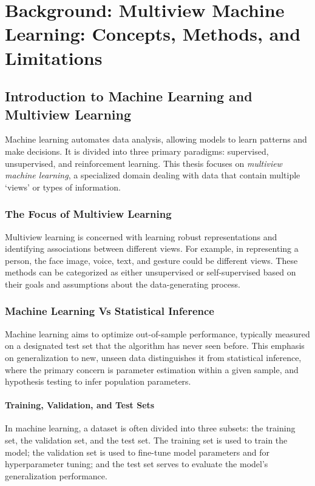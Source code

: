 \chapter{Background: Multiview Machine Learning: Concepts, Methods, and Limitations}\label{chap:background}
\minitoc

\section{Introduction to Machine Learning and Multiview Learning}

Machine learning automates data analysis, allowing models to learn patterns and make decisions. It is divided into three primary paradigms: supervised, unsupervised, and reinforcement learning. This thesis focuses on \textit{multiview machine learning}, a specialized domain dealing with data that contain multiple `views' or types of information. 

\subsection{The Focus of Multiview Learning}

Multiview learning is concerned with learning robust representations and identifying associations between different views. For example, in representing a person, the face image, voice, text, and gesture could be different views. These methods can be categorized as either unsupervised or self-supervised based on their goals and assumptions about the data-generating process.

\subsection{Machine Learning Vs Statistical Inference}
Machine learning aims to optimize out-of-sample performance, typically measured on a designated test set that the algorithm has never seen before. This emphasis on generalization to new, unseen data distinguishes it from statistical inference, where the primary concern is parameter estimation within a given sample, and hypothesis testing to infer population parameters.

\subsubsection{Training, Validation, and Test Sets}

In machine learning, a dataset is often divided into three subsets: the training set, the validation set, and the test set. The training set is used to train the model; the validation set is used to fine-tune model parameters and for hyperparameter tuning; and the test set serves to evaluate the model's generalization performance. 


